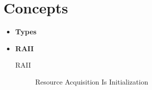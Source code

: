 \documentclass{article}
\begin{document}
\section{Concepts}
\begin{itemize}
	\item \textbf{Types}
	\item \textbf{RAII}
	      \begin{description}
		      \item[RAII]
		            Resource Acquisition Is Initialization
	      \end{description}
\end{itemize}
\end{document}
